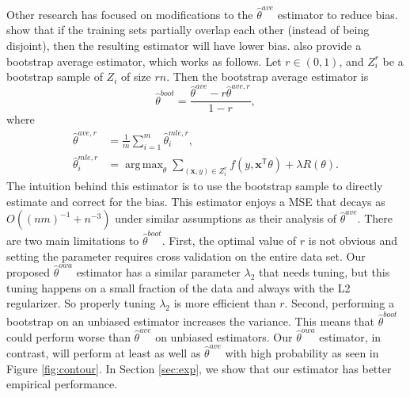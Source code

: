 \documentclass[twoside]{article}
\DeclareMathOperator*{\argmin}{arg\,min}
\DeclareMathOperator*{\argmax}{arg\,max}
\newcommand{\x}{\mathbf{x}}
\newcommand{\w}{\theta}
\newcommand{\wowa}{\hat\w^{owa}}
\newcommand{\wave}{\hat\w^{ave}}
\newcommand{\waver}{\hat\w^{ave,r}}
\newcommand{\wboot}{\hat\w^{boot}}
\newcommand{\wmle}{\hat\w^{mle}}
\newcommand{\wmler}{\hat\w^{mle,r}}
\newcommand{\trans}[1]{\ensuremath{{#1}^{\mathsf{T}}}}
\newcommand{\ltwo}[1]{{\lVert {#1} \rVert}}
\begin{document}
Other research has focused on modifications to the $\wave$ estimator to reduce bias.
\cite{zinkevich2010parallelized} show that if the training sets partially overlap each other (instead of being disjoint), then the resulting estimator will have lower bias.
\cite{zhang2012communication} also provide a bootstrap average estimator,
which works as follows.
Let $r\in(0,1)$, and $Z_i^r$ be a bootstrap sample of $Z_i$ of size $rn$.
Then the bootstrap average estimator is
\begin{equation}
\wboot = \frac{\wave-r\waver}{1-r}
,
\end{equation}
where
\begin{equation}
\begin{aligned}
\waver &= \frac{1}{m}\sum_{i=1}^m \wmler_i
,
\\
\wmler_i &= \argmax_\w \sum_{(\x,y)\in Z_i^r} f(y,\trans\x\w) + \lambda R(\w)
.
\end{aligned}
\end{equation}
The intuition behind this estimator is to use the bootstrap sample to directly estimate and correct for the bias.
This estimator enjoys a MSE that decays as $O((nm)^{-1}+n^{-3})$ under similar assumptions as their analysis of $\wave$.
There are two main limitations to $\wboot$.
First, the optimal value of $r$ is not obvious and setting the parameter requires cross validation on the entire data set.
Our proposed $\wowa$ estimator has a similar parameter $\lambda_2$ that needs tuning,
but this tuning happens on a small fraction of the data and always with the L2 regularizer.
So properly tuning $\lambda_2$ is more efficient than $r$.
Second, performing a bootstrap on an unbiased estimator increases the variance.
This means that $\wboot$ could perform worse than $\wave$ on unbiased estimators.
Our $\wowa$ estimator, in contrast, will perform at least as well as $\wave$ with high probability as seen in Figure \ref{fig:contour}.
In Section \ref{sec:exp}, we show that our estimator has better empirical performance.

\end{document}
